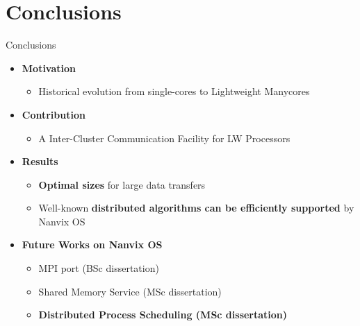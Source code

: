 \section{Conclusions}

	\begin{frame}[fragile]{Conclusions}
		\begin{itemize}
			\item \textbf{Motivation}
			\begin{itemize}
				\item Historical evolution from single-cores to Lightweight Manycores
			\end{itemize}
		\end{itemize}

		\begin{itemize}
			\item \textbf{Contribution}
			\begin{itemize}
				\item A Inter-Cluster Communication Facility for LW Processors
			\end{itemize}
		\end{itemize}

		\begin{itemize}
			\item \textbf{Results}
			\begin{itemize}
				\item \textbf{Optimal sizes} for large data transfers
				\item Well-known \textbf{distributed algorithms can be efficiently supported} by Nanvix OS
			\end{itemize}
		\end{itemize}


		\begin{itemize}
			\item \textbf{Future Works on Nanvix OS}
			\begin{itemize}
				\item MPI port (BSc dissertation)
				\item Shared Memory Service (MSc dissertation)
				\item \textbf{Distributed Process Scheduling (MSc dissertation)}
			\end{itemize}
		\end{itemize}

		
	\end{frame}

